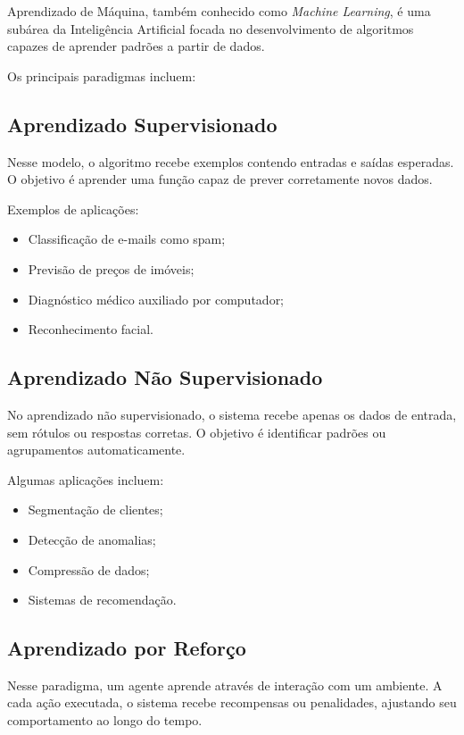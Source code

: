 \documentclass[11pt]{article}
\begin{document}
Aprendizado de Máquina, também conhecido como \textit{Machine Learning}, é uma subárea da
Inteligência Artificial focada no desenvolvimento de algoritmos capazes de aprender padrões a
partir de dados.

Os principais paradigmas incluem: 

\subsection{Aprendizado Supervisionado}

Nesse modelo, o algoritmo recebe exemplos contendo entradas e saídas esperadas. O objetivo é
aprender uma função capaz de prever corretamente novos dados.

Exemplos de aplicações:

\begin{itemize}
    \item Classificação de e-mails como spam;
    \item Previsão de preços de imóveis;
    \item Diagnóstico médico auxiliado por computador;
    \item Reconhecimento facial.
\end{itemize}
 

\subsection{Aprendizado Não Supervisionado}

No aprendizado não supervisionado, o sistema recebe apenas os dados de entrada, sem rótulos
ou respostas corretas. O objetivo é identificar padrões ou agrupamentos automaticamente.

Algumas aplicações incluem:

\begin{itemize}
    \item Segmentação de clientes;
    \item Detecção de anomalias;
    \item Compressão de dados;
    \item Sistemas de recomendação.
\end{itemize} 

\subsection{Aprendizado por Reforço}

Nesse paradigma, um agente aprende através de interação com um ambiente. A cada ação
executada, o sistema recebe recompensas ou penalidades, ajustando seu comportamento ao
longo do tempo.
\end{document}
